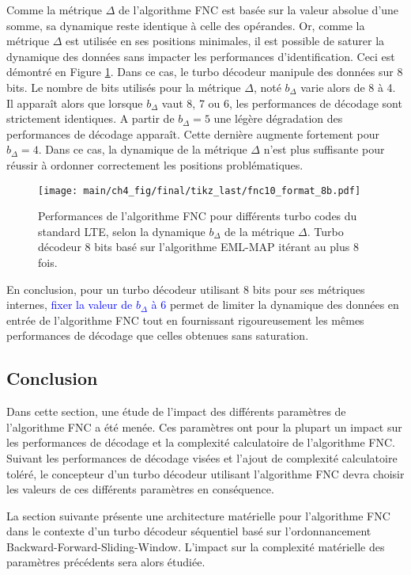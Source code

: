 Comme la métrique $\Delta$ de l'algorithme FNC est basée sur la valeur absolue d'une somme, sa dynamique reste identique 
à celle des opérandes. Or, comme la métrique $\Delta$  est utilisée en ses positions minimales, il est possible de 
saturer la dynamique des données sans impacter les performances d'identification. Ceci est démontré en Figure 
\ref{fig:fnc_format_8b}. Dans ce cas, le turbo décodeur manipule des données sur 8 bits. Le nombre de bits utilisés pour 
la métrique $\Delta$, noté $b_{\Delta}$ varie alors de 8 à 4. Il apparaît alors que lorsque $b_{\Delta}$ vaut 8, 7 ou 6,
les performances de décodage sont strictement identiques. A partir de $b_{\Delta} = 5$ une légère dégradation des 
performances de décodage apparaît. Cette dernière augmente fortement pour $b_{\Delta} = 4$. Dans ce cas, la dynamique 
de la métrique $\Delta$ n'est plus suffisante pour réussir à ordonner correctement les positions problématiques.

\begin{figure}[!h]
	\hspace*{-.075\textwidth}
	\texttt{[image: main/ch4\_fig/final/tikz\_last/fnc10\_format\_8b.pdf]}
	\caption{Performances de l'algorithme FNC pour différents turbo codes du standard LTE, selon la dynamique $b_{\Delta}$ 
	de la métrique $\Delta$.
	Turbo décodeur 8 bits basé sur l'algorithme EML-MAP itérant au plus 8 fois.
	\label{fig:fnc_format_8b}}
\end{figure}

En conclusion, pour un turbo décodeur utilisant 8 bits pour ses métriques internes, \textcolor{blue}{fixer la valeur de 
$b_{\Delta}$ à 6} permet de limiter la dynamique des données en entrée de l'algorithme FNC tout en fournissant 
rigoureusement les mêmes performances de décodage que celles obtenues sans saturation.

\subsection{Conclusion}
Dans cette section, une étude de l'impact des différents paramètres de l'algorithme FNC a été menée. Ces paramètres ont
pour la plupart un impact sur les performances de décodage et la complexité calculatoire de l'algorithme FNC. Suivant 
les performances de décodage visées et l'ajout de complexité calculatoire toléré, le concepteur d'un turbo décodeur 
utilisant l'algorithme FNC devra choisir les valeurs de ces différents paramètres en conséquence.

La section suivante présente une architecture matérielle pour l'algorithme FNC dans le contexte d'un turbo décodeur 
séquentiel basé sur l'ordonnancement Backward-Forward-Sliding-Window. L'impact sur la complexité matérielle des 
paramètres précédents sera alors étudiée.

